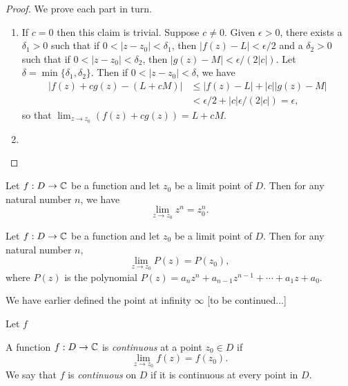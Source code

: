 \begin{proof}
    We prove each part in turn.
    \begin{enumerate}[label=(\alph*), wide]
        \item If \(c = 0\) then this claim is trivial. Suppose \(c \neq 0\). Given \(\epsilon > 0\), there exists a \(\delta_1 > 0\) such that if \(0 < |z - z_0| < \delta_1\), then \(|f(z) - L| < \epsilon/2\) and a \(\delta_2 > 0\) such that if \(0 < |z - z_0| < \delta_2\), then \(|g(z) - M| < \epsilon/(2|c|)\). Let \(\delta = \min\{\delta_1, \delta_2\}\). Then if \(0 < |z - z_0| < \delta\), we have
        \begin{align*}
            |f(z) + cg(z) - (L + cM)| &\leq |f(z) - L| + |c||g(z) - M|\\
                    &< \epsilon/2 + |c|\epsilon/(2|c|) = \epsilon,
        \end{align*}
        so that \(\lim_{z \to z_0} (f(z) + cg(z)) = L + cM\).
        \item 
    \end{enumerate}
\end{proof}

\begin{theorem}
    Let \(f: D \to \mathbb{C}\) be a function and let \(z_0\) be a limit point of \(D\). Then for any natural number \(n\), we have
    \[
        \lim_{z \to z_0} z^n = z_0^n.
    \]
\end{theorem}

\begin{theorem}
    Let \(f: D \to \mathbb{C}\) be a function and let \(z_0\) be a limit point of \(D\). Then for any natural number \(n\),
    \[
        \lim_{z \to z_0} P(z) = P(z_0),
    \]
    where \(P(z)\) is the polynomial \(P(z) = a_n z^n + a_{n-1} z^{n-1} + \cdots + a_1 z + a_0\).
\end{theorem}


We have earlier defined the point at infinity \(\infty\) [to be continued...]

\begin{theorem}
    Let \(f\)
    
\end{theorem}



\begin{definition}[Continuity]
    A function \(f : D \to \mathbb{C}\) is \emph{continuous} at a point \(z_0 \in D\) if
    \[
        \lim_{z \to z_0} f(z) = f(z_0).
    \]
    We say that \(f\) is \emph{continuous} on \(D\) if it is continuous at every point in \(D\).
    \label{def:continuity}
\end{definition}

